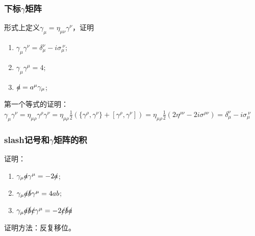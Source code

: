 \documentclass[aspectratio=1610,14pt,matheuler]{beamer}
\newcommand{\bch}{}
\newcommand{\ech}{}
\begin{document}
\begin{frame}
\frametitle{\bch 下标$\gamma$矩阵 \ech}
\bch
形式上定义$\gamma_\mu = \eta_{\mu \nu} \gamma^\nu$，证明
\begin{enumerate}
\item $\gamma_\mu \gamma^\nu = \delta_\mu^\nu -i \sigma_\mu^{\ \nu}$;
\item $\gamma_\mu \gamma^\mu = 4$;
\item $\slashed a = a^\mu \gamma_\mu$;
\end{enumerate}
第一个等式的证明：{ $\gamma_\mu \gamma^\nu = \eta_{\mu \rho} \gamma^\rho \gamma^\nu = \eta_{\mu \rho} \frac{1}{2} ( \{\gamma^\rho,\gamma^\nu\} + [\gamma^\rho,\gamma^\nu]) = \eta_{\mu \rho} \frac{1}{2} (2\eta^{\rho \nu} - 2i \sigma^{\rho \nu}) = \delta_\mu^\nu -i \sigma_\mu^{\ \nu}$}
\ech
\end{frame}

\begin{frame}
\frametitle{\bch slash记号和$\gamma$矩阵的积 \ech}
\bch
证明：
\begin{enumerate}
\item $\gamma_\mu \slashed a \gamma^\mu = -2 \slashed a$;
\item $\gamma_\mu \slashed a \slashed b \gamma^\mu = 4ab$;
\item $\gamma_\mu \slashed a \slashed b \slashed c \gamma^\mu = -2 \slashed c \slashed b \slashed a$
\end{enumerate}
证明方法：反复移位。
\ech
\end{frame}
\end{document}
